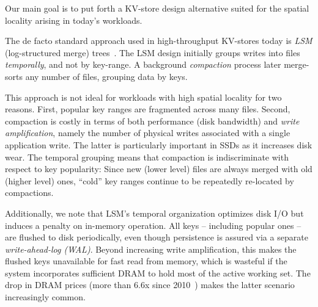 Our main goal is to 
put forth a KV-store design alternative  suited for the 
spatial locality arising in today's  workloads. 


The de facto standard approach used in high-throughput KV-stores today is \emph{LSM} (log-structured merge) trees~\cite{DBLP:journals/acta/ONeilCGO96}. 
The LSM design initially groups writes  into files \emph{temporally}, and not by key-range. 
A background \emph{compaction} process later merge-sorts any number of files, grouping data by keys. 

This approach is not ideal for workloads with high spatial locality for two reasons. 
First,  popular key ranges are fragmented across many files. 
Second,  compaction  is costly in terms of  both performance 
(disk bandwidth) and \emph{write amplification}, namely the number of physical writes 
associated with a single application write. The latter is  particularly important in SSDs as it increases disk wear. 
The temporal grouping means that compaction is indiscriminate with respect to key popularity:  
Since new (lower level) files are always merged with old (higher level) ones, 
 ``cold'' key ranges  continue to be repeatedly re-located by  compactions.  

Additionally, we note that LSM's temporal  organization optimizes disk I/O but induces a penalty on in-memory operation. 
All keys -- including popular ones -- are flushed to disk periodically, even though persistence is assured via a separate \emph{write-ahead-log (WAL)}.
Beyond increasing write amplification, this makes the flushed keys unavailable for fast read from memory,
which is  wasteful if the system incorporates sufficient DRAM to hold most of the active working set. 
The drop in DRAM prices (more than $6.6$x since 2010~\cite{dram-prices}) makes the latter scenario increasingly common.  

